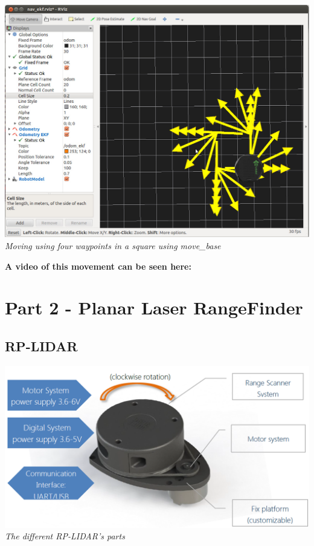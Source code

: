 \documentclass[10pt,a4paper]{article}
\begin{document}
\begin{center}
\includegraphics[width=\textwidth]{images/move_base_square.jpg}\\
\textit{Moving using four waypoints in a square using move\_base}
\end{center}

\textbf{A video of this movement can be seen here:}\\


\section{Part 2 - Planar Laser RangeFinder}

\subsection{RP-LIDAR}

\begin{center}
\includegraphics[scale=0.4]{images/lidarParts.png}\\
\textit{The different RP-LIDAR's parts}
\end{center}
\end{document}
